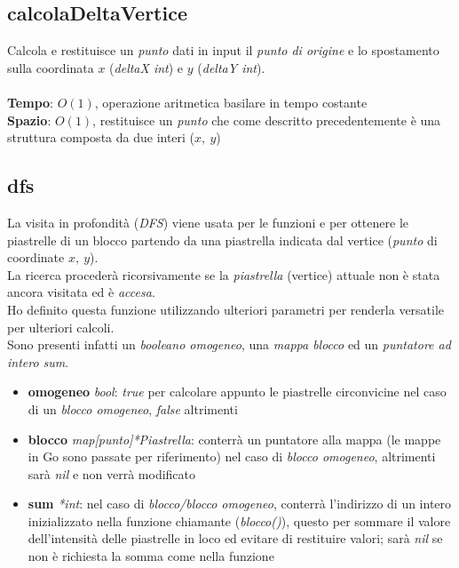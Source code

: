 \documentclass{article}
\begin{document}
\subsection{calcolaDeltaVertice}
Calcola e restituisce un \textit{punto} dati in input il \textit{punto di origine} e lo spostamento sulla coordinata \(x\) (\textit{deltaX int}) e \(y\) (\textit{deltaY int}).\\ \\
\textbf{Tempo}: \(O(1)\), operazione aritmetica basilare in tempo costante \\
\textbf{Spazio}: \(O(1)\), restituisce un \textit{punto} che come descritto precedentemente è una struttura composta da due interi (\(x,\ y\))

\subsection{dfs}\label{subsec:dfs}
La visita in profondità (\textit{DFS}) viene usata per le funzioni  e  per ottenere le piastrelle di un blocco partendo da una piastrella indicata dal vertice (\textit{punto} di coordinate \(x,\ y\)).\\
La ricerca procederà ricorsivamente se la \textit{piastrella} (vertice) attuale non è stata ancora visitata ed è \textit{accesa}.\\
Ho definito questa funzione utilizzando ulteriori parametri per renderla versatile per ulteriori calcoli.\\
Sono presenti infatti un \textit{booleano omogeneo}, una \textit{mappa blocco} ed un \textit{puntatore ad intero sum}.

\begin{itemize}
  \item \textbf{omogeneo} \textit{bool}: \textit{true} per calcolare appunto le piastrelle circonvicine nel caso di un \textit{blocco omogeneo}, \textit{false} altrimenti
  \item \textbf{blocco} \textit{map[punto]*Piastrella}: conterrà un puntatore alla mappa (le mappe in Go sono passate per riferimento) nel caso di \textit{blocco omogeneo}, altrimenti sarà \textit{nil} e non verrà modificato
  \item \textbf{sum} \textit{*int}: nel caso di \textit{blocco/blocco omogeneo}, conterrà l'indirizzo di un intero inizializzato nella funzione chiamante (\textit{blocco()}), questo per sommare il valore dell'intensità delle piastrelle in loco ed evitare di restituire valori; sarà \textit{nil} se non è richiesta la somma come nella funzione 
\end{itemize}
\end{document}
